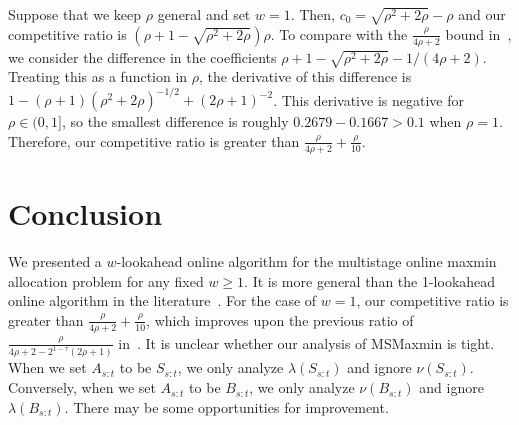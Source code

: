 \documentclass[11pt,a4paper]{article}
\renewcommand{\geq}{\geqslant}
\begin{document}
Suppose that we keep $\rho$ general and set $w = 1$.  Then, $c_0 = \sqrt{\rho^2 + 2\rho} - \rho$ and our competitive ratio is $(\rho+1-\sqrt{\rho^2+2\rho})\rho$.  To compare with the $\frac{\rho}{4\rho+2}$ bound in~\cite{BEM18}, we consider the difference in the coefficients $\rho+1 - \sqrt{\rho^2+2\rho} - 1/(4\rho+2)$.  Treating this as a function in $\rho$, the derivative of this difference is $1 - (\rho+1)(\rho^2+2\rho)^{-1/2} + (2\rho+1)^{-2}$.  This derivative is negative for $\rho \in (0,1]$, so the smallest difference is roughly $0.2679 - 0.1667 > 0.1$ when $\rho=1$.  Therefore, our competitive ratio is greater than $\frac{\rho}{4\rho+2} + \frac{\rho}{10}$.




\section{Conclusion}

We presented a $w$-lookahead online algorithm for the multistage online maxmin allocation problem for any fixed $w \geq 1$.   It is more general than the 1-lookahead online algorithm in the literature~\cite{BEM18}.  For the case of $w=1$, our competitive ratio is greater than $\frac{\rho}{4\rho+2} + \frac{\rho}{10}$, which improves upon the previous ratio of $\frac{\rho}{4\rho+2 - 2^{1-\tau}(2\rho+1)}$ in~\cite{BEM18}.  It is unclear whether our analysis of MSMaxmin is tight.  When we set $A_{s:t}$ to be $S_{s:t}$, we only analyze $\lambda(S_{s:t})$ and ignore $\nu(S_{s:t})$.  Conversely, when we set $A_{s:t}$ to be $B_{s:t}$, we only analyze $\nu(B_{s:t})$ and ignore $\lambda(B_{s:t})$.   There may be some opportunities for improvement.




\end{document}
